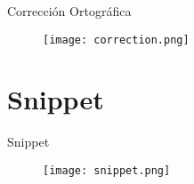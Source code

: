 \documentclass{beamer}
\begin{document}
\begin{frame}{Corrección Ortográfica}
    \begin{figure}
        \texttt{[image: correction.png]}
    \end{figure}
\end{frame}


\section{Snippet}

\begin{frame}{Snippet}
    \begin{figure}
        \texttt{[image: snippet.png]}
    \end{figure}
\end{frame}
\end{document}
